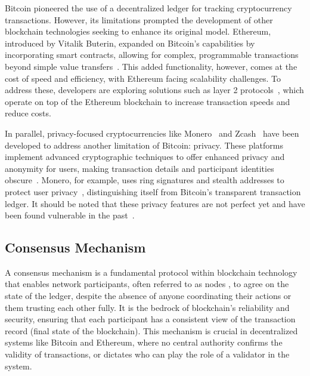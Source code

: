 Bitcoin pioneered the use of a decentralized ledger for tracking cryptocurrency transactions. However, its limitations prompted the development of other blockchain technologies seeking to enhance its original model. Ethereum, introduced by Vitalik Buterin, expanded on Bitcoin’s capabilities by incorporating smart contracts, allowing for complex, programmable transactions beyond simple value transfers~\cite{buterin2014next}. This added functionality, however, comes at the cost of speed and efficiency, with Ethereum facing scalability challenges. To address these, developers are exploring solutions such as layer 2 protocols~\cite{clark2018sok:online,optimismgithub,kalodner2018arbitrum}, which operate on top of the Ethereum blockchain to increase transaction speeds and reduce costs.

In parallel, privacy-focused cryptocurrencies like Monero~\cite{monero} and Zcash~\cite{hopwood2016zcash} have been developed to address another limitation of Bitcoin: privacy. These platforms implement advanced cryptographic techniques to offer enhanced privacy and anonymity for users, making transaction details and participant identities obscure~\cite{van2013cryptonote, miers2013zerocoin}. Monero, for example, uses ring signatures and stealth addresses to protect user privacy~\cite{cryptoeprint2015}, distinguishing itself from Bitcoin's transparent transaction ledger. It should be noted that these privacy features are not perfect yet and have been found vulnerable in the past~\cite{kumar2017traceability,miller2017empirical}.



\subsection{Consensus Mechanism}\label{consensus_mechanism}
A consensus mechanism is a fundamental protocol within blockchain technology that enables network participants, often referred to as nodes , to agree on the state of the ledger, despite the absence of anyone coordinating their actions or them trusting each other fully. It is the bedrock of blockchain's reliability and security, ensuring that each participant has a consistent view of the transaction record (final state of the blockchain). This mechanism is crucial in decentralized systems like Bitcoin and Ethereum, where no central authority confirms the validity of transactions, or dictates who can play the role of a validator in the system. 

